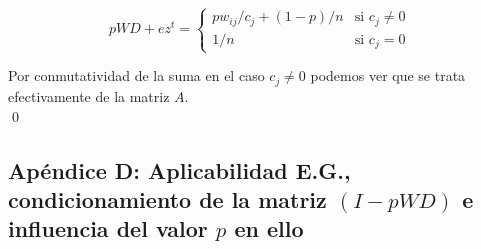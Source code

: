 		\[
			        pWD+ez^{t} = 	\begin{cases}
							pw_{ij}/c_j+(1-p)/n & \text{si } c_{j} \neq 0 \\
								     1   /n & \text{si } c_{j}   =  0
						\end  {cases}
		\]

		Por conmutatividad de la suma en el caso $c_j \neq 0$ podemos ver que se trata efectivamente de la matriz $A$. \\

		\qed

	\clearpage

	\subsection{Apéndice D: Aplicabilidad E.G., condicionamiento de la matriz $(I-pWD)$ e influencia del valor $p$ en ello}

	\clearpage

